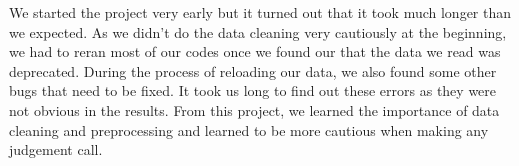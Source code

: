 \documentclass[letterpaper,11pt]{article}
\begin{document}
We started the project very early but it turned out that it took much longer than we expected. As we didn't do the data cleaning very cautiously at the beginning, we had to reran most of our codes once we found our that the data we read was deprecated. During the process of reloading our data, we also found some other bugs that need to be fixed. It took us long to find out these errors as they were not obvious in the results. From this project, we learned the importance of data cleaning and preprocessing and learned to be more cautious when making any judgement call.
\end{document}
